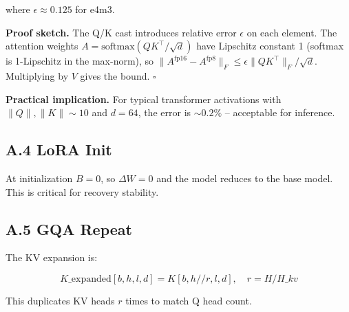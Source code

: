 where $\epsilon \approx 0.125$ for e4m3.

\textbf{Proof sketch.} The Q/K cast introduces relative error $\epsilon$ on each 
element. The attention weights $A = \text{softmax}(QK^\top/\sqrt{d})$ have 
Lipschitz constant 1 (softmax is 1-Lipschitz in the max-norm), so 
$\|A^\text{fp16} - A^\text{fp8}\|_F \leq \epsilon \|QK^\top\|_F / \sqrt{d}$. 
Multiplying by $V$ gives the bound. $\square$

\textbf{Practical implication.} For typical transformer activations with 
$\|Q\|, \|K\| \sim 10$ and $d = 64$, the error is $\sim 0.2\%$ -- acceptable 
for inference.

\subsection{A.4 LoRA Init}

At initialization $B = 0$, so $\Delta W = 0$ and the model reduces to the 
base model. This is critical for recovery stability.

\subsection{A.5 GQA Repeat}

The KV expansion is:

\[
K\_\text{expanded}[b, h, l, d] = K[b, h // r, l, d], \quad r = H / H\_{kv}
\tag{A.5}
\]

This duplicates KV heads $r$ times to match Q head count.

